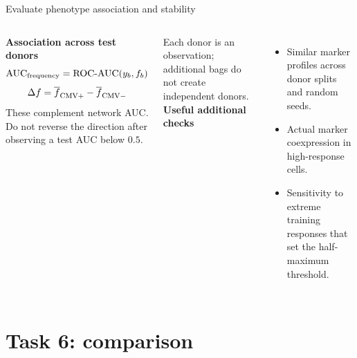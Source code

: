 \documentclass[aspectratio=169,10pt]{beamer}
\newcommand{\slidelabel}{SSBI}
\begin{document}
\begin{frame}{Evaluate phenotype association and stability}

\begin{columns}[T,onlytextwidth]
\textbf{Association across test donors}
\[\mathrm{AUC}_{\rm frequency}=\mathrm{ROC\text{-}AUC}(y_b,f_b)\]
\[\Delta f=\overline f_{\rm CMV+}-\overline f_{\rm CMV-}\]
\small These complement network AUC. Do not reverse the direction after observing a test AUC below $0.5$.\par
\vspace{2mm}
Each donor is an observation; additional bags do not create independent donors.
\textbf{Useful additional checks}
\begin{itemize}
\item Similar marker profiles across donor splits and random seeds.
\item Actual marker coexpression in high-response cells.
\item Sensitivity to extreme training responses that set the half-maximum threshold.
\end{itemize}
\end{columns}

\end{frame}

\renewcommand{\slidelabel}{SSBI · Task 6}
\section{Task 6: comparison}

\appendix

\renewcommand{\slidelabel}{SSBI · Task 2 · Backup}
\end{document}
